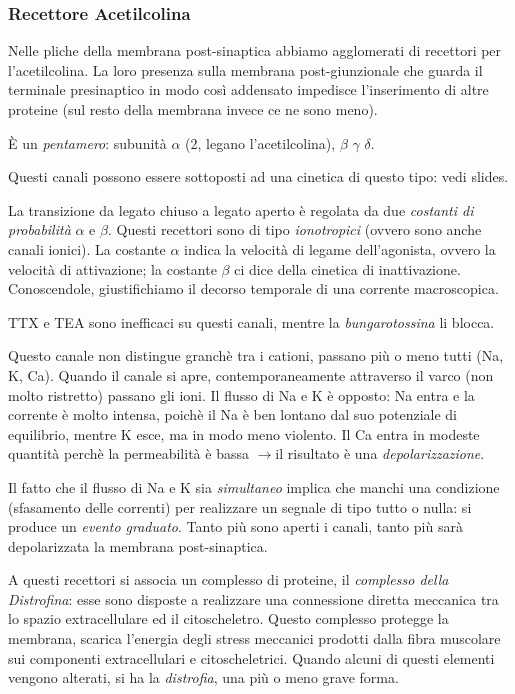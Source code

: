 \documentclass[a4paper,12pt]{article}
\newcommand{\lfreccia}{\ensuremath{\longrightarrow}}
\begin{document}
\subsubsection{Recettore Acetilcolina}
Nelle pliche della membrana post-sinaptica abbiamo agglomerati di recettori per l'acetilcolina. La loro presenza sulla membrana post-giunzionale che guarda il terminale presinaptico in modo così addensato impedisce l'inserimento di altre proteine (sul resto della membrana invece ce ne sono meno).

È un \emph{pentamero}: subunità $\alpha$ (2, legano l'acetilcolina), $\beta$ $\gamma$ $\delta$.

Questi canali possono essere sottoposti ad una cinetica di questo tipo: vedi slides.

La transizione da legato chiuso a legato aperto è regolata da due \emph{costanti di probabilità} $\alpha$ e $\beta$. Questi recettori sono di tipo \emph{ionotropici} (ovvero sono anche canali ionici). La costante $\alpha$ indica la velocità di legame dell'agonista, ovvero la velocità di attivazione; la costante $\beta$ ci dice della cinetica di inattivazione. Conoscendole, giustifichiamo il decorso temporale di una corrente macroscopica.

TTX e TEA sono inefficaci su questi canali, mentre la \emph{bungarotossina} li blocca.

Questo canale non distingue granchè tra i cationi, passano più o meno tutti (Na, K, Ca). Quando il canale si apre, contemporaneamente attraverso il varco (non molto ristretto) passano gli ioni. Il flusso di Na e K è opposto: Na entra e la corrente è molto intensa, poichè il Na è ben lontano dal suo potenziale di equilibrio, mentre K esce, ma in modo meno violento. Il Ca entra in modeste quantità perchè la permeabilità è bassa \lfreccia il risultato è una \emph{depolarizzazione}.

Il fatto che il flusso di Na e K sia \emph{simultaneo} implica che manchi una condizione (sfasamento delle correnti) per realizzare un segnale di tipo tutto o nulla: si produce un \emph{evento graduato}. Tanto più sono aperti i canali, tanto più sarà depolarizzata la membrana post-sinaptica.

A questi recettori si associa un complesso di proteine, il \emph{complesso della Distrofina}: esse sono disposte a realizzare una connessione diretta meccanica tra lo spazio extracellulare ed il citoscheletro. Questo complesso protegge la membrana, scarica l'energia degli stress meccanici prodotti dalla fibra muscolare sui componenti extracellulari e citoscheletrici. Quando alcuni di questi elementi vengono alterati, si ha la \emph{distrofia}, una più o meno grave forma.
\end{document}
